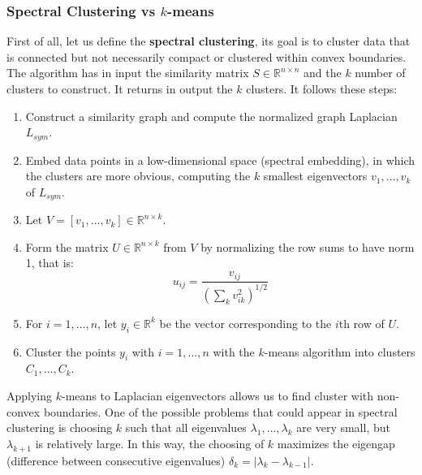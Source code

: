 \subsubsection{Spectral Clustering vs $k$-means}
First of all, let us define the \textbf{spectral clustering}, its goal is to cluster data that is connected but not necessarily compact or clustered within convex boundaries. The algorithm has in input the similarity matrix $S \in \mathbb{ R }^{n \times n}$ and the $k$ number of clusters to construct. It returns in output the $k$ clusters. It follows these steps:
\begin{enumerate}
	\item Construct a similarity graph and compute the normalized graph Laplacian $L_{sym}$.
	\item Embed data points in a low-dimensional space (spectral embedding), in which the clusters are more obvious, computing the $k$ smallest eigenvectors $v_1, \dots, v_k$ of $L_{sym}$. 
	\item Let $V=\left[v_1,\dots, v_k \right] \in \mathbb{ R }^{n \times k}$.
	\item Form the matrix $U \in \mathbb{ R }^{n \times k}$ from $V$ by normalizing the row sums to have norm 1, that is: 
	$$u_ { i j } = \frac { v _ { i j } } { \left( \sum _ { k } v _ { i k } ^ { 2 } \right) ^ { 1 / 2 } }$$
	\item For $i=1,\dots, n$, let $y _ { i } \in \mathbb { R } ^ { k }$ be the vector corresponding to the $i$th row of $U$.
	\item Cluster the points $y_i$ with $i=1,\dots,n$ with the $k$-means algorithm into clusters $C_1, \dots, C_k$.
\end{enumerate}
Applying $k$-means to Laplacian eigenvectors allows us to find cluster with non-convex boundaries.
One of the possible problems that could appear in spectral clustering is choosing $k$ such that all eigenvalues $\lambda_1, \dots, \lambda_k$ are very small, but $\lambda_{k+1}$ is relatively large. In this way, the choosing of $k$ maximizes the eigengap (difference between consecutive eigenvalues) $\delta_k = |\lambda_k - \lambda_{k-1}|$.
